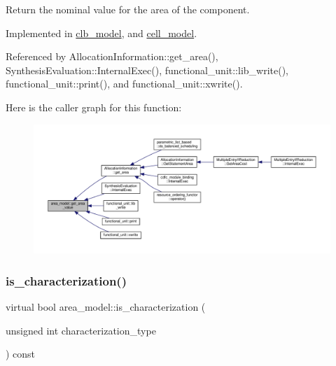 Return the nominal value for the area of the component. 



Implemented in \hyperlink{classclb__model_ad974c55b8a7022c383d3f9447d887dbb}{clb\+\_\+model}, and \hyperlink{classcell__model_aa96db127d4432fd0a3f4f8db95e29fd8}{cell\+\_\+model}.



Referenced by Allocation\+Information\+::get\+\_\+area(), Synthesis\+Evaluation\+::\+Internal\+Exec(), functional\+\_\+unit\+::lib\+\_\+write(), functional\+\_\+unit\+::print(), and functional\+\_\+unit\+::xwrite().

Here is the caller graph for this function\+:
\nopagebreak
\begin{figure}[H]
\begin{center}
\leavevmode
\includegraphics[width=350pt]{d3/d16/classarea__model_a390c12b38a4f2b1a137f6029d5494b97_icgraph}
\end{center}
\end{figure}
\mbox{\label{classarea__model_ae885ec3d0b487d31fd2e7537dd588ce3}} 
\subsubsection{\texorpdfstring{is\+\_\+characterization()}{is\_characterization()}}
{\footnotesize\ttfamily virtual bool area\+\_\+model\+::is\+\_\+characterization (\begin{DoxyParamCaption}\item[{unsigned int}]{characterization\+\_\+type }\end{DoxyParamCaption}) const\hspace{0.3cm}{\ttfamily [pure virtual]}}



